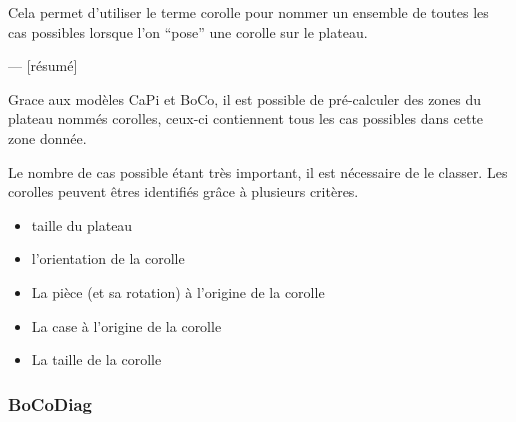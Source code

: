 	Cela permet d'utiliser le terme corolle pour nommer un ensemble de toutes les cas possibles lorsque l'on \enquote{pose} une corolle sur le plateau.
	
	--- [résumé]

	Grace aux modèles CaPi et BoCo, il est possible de pré-calculer des zones du plateau nommés corolles, ceux-ci contiennent tous les cas possibles dans cette zone donnée.

	Le nombre de cas possible étant très important, il est nécessaire de le classer. Les corolles peuvent êtres identifiés grâce à plusieurs critères.

	\begin{itemize}
		\item taille du plateau
		\item l'orientation de la corolle
		\item La pièce (et sa rotation) à l'origine de la corolle
		\item La case à l'origine de la corolle
		\item La taille de la corolle
	\end{itemize}

	\subsubsection{BoCoDiag}
	
